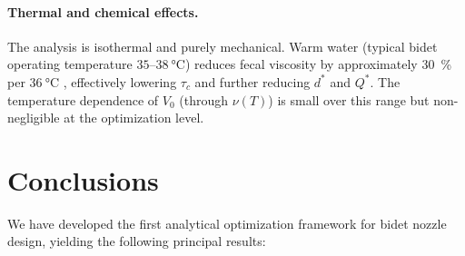 \documentclass[aps,prfluids,reprint,amsmath,amssymb,floatfix]{revtex4-2}
\begin{document}
\paragraph{Thermal and chemical effects.}
The analysis is isothermal and purely mechanical. Warm water (typical
bidet operating temperature $35$--$\SI{38}{\celsius}$) reduces fecal
viscosity by approximately \SI{30}{\percent} per $\SI{36}{\celsius}$
\citep{Woolley2014}, effectively lowering $\tau_c$ and further reducing
$d^*$ and $Q^*$. The temperature dependence of $V_0$ (through $\nu(T)$)
is small over this range but non-negligible at the optimization level.

\section{Conclusions}
\label{sec:conclusion}

We have developed the first analytical optimization framework for bidet
nozzle design, yielding the following principal results:
\end{document}

